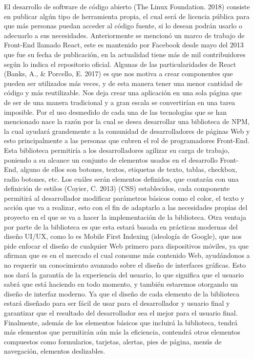 El desarrollo de software de código abierto \cite{openSource} (The Linux Foundation. 2018) consiste en publicar algún tipo de herramienta propia, el cual será de licencia pública para que más personas puedan acceder al código fuente, si lo desean podrán usarlo o adecuarlo a sus necesidades. 
Anteriormente se mencionó un marco de trabajo de Front-End llamado React, este es mantenido por Facebook desde mayo del 2013 que fue su fecha de publicación, en la actualidad tiene más de mil contribuidores según lo indica el repositorio oficial. 
Algunas de las particularidades de React  \cite{reactOreilly} (Banks, A., & Porcello, E. 2017) es que nos motiva a crear componentes que pueden ser utilizados más veces, y de esta manera tener una menor cantidad de código y más reutilizable. 
Nos deja crear una aplicación en una sola página que de ser de una manera tradicional y a gran escala se convertirían en una tarea imposible.
\newline
Por el uso desmedido de cada una de las tecnologías que se han mencionado nace la razón por la cual se desea desarrollar una biblioteca de NPM, la cual ayudará grandemente a la comunidad de desarrolladores de páginas Web y esto principalmente a las personas que cubren el rol de programadores Front-End. 
Esta biblioteca permitiría a los desarrolladores agilizar su carga de trabajo, poniendo a su alcance un conjunto de elementos usados en el desarrollo Front-End, alguno de ellos son botones, textos, etiquetas de texto, tablas, checkbox, radio botones, etc.  Los cuáles serán elementos definidos, que contarán con una definición de estilos \cite{scss} (Coyier, C. 2013) (CSS) establecidos, cada componente permitirá al desarrollador modificar parámetros básicos como el color, el texto y acción que va a realizar, esto con el fin de adaptarlo a las necesidades propias del proyecto en el que se va a hacer la implementación de la biblioteca.  
Otra ventaja por parte de la biblioteca es que esta estará basada en prácticas modernas del diseño UI/UX, como lo es Mobile First \cite{mobileFirst} Indexing (ideología de Google), que nos pide enfocar el diseño de cualquier Web primero para dispositivos móviles, ya que afirman que es en el mercado el cual consume más contenido Web, ayudándonos a no requerir un conocimiento avanzado sobre el diseño de interfaces gráficas. 
Esto nos dará la garantía de la experiencia del usuario, lo que significa que el usuario sabrá que está haciendo en todo momento, y también estaremos otorgando un diseño de interfaz moderno.
Ya que el diseño de cada elemento de la biblioteca estará diseñado para ser fácil de usar para el desarrollador y usuario final y garantizar que el resultado del desarrollador sea el mejor para el usuario final.
Finalmente, además de los elementos básicos que incluirá la biblioteca, tendrá más elementos que permitirán aún más la eficiencia, contendrá otros elementos compuestos como formularios, tarjetas, alertas, pies de página, menús de navegación, elementos deslizables. 

